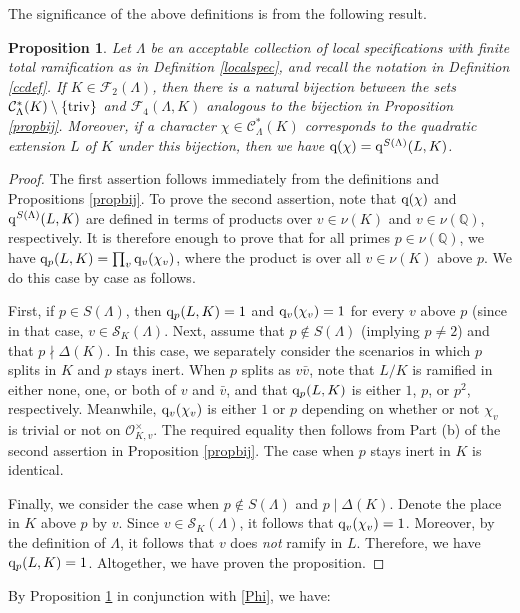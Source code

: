 \documentclass[10pt]{article}
\theoremstyle{plain}
\newtheorem{proposition}[thm]{Proposition}
\theoremstyle{definition}
\theoremstyle{remark}
\def\val{{\nu}}
\def\FF{{\mathcal F}}
\def\Q{{\mathbb Q}}
\def\Q{{\mathbb Q}}
\def\cC{{\mathcal C}}
\def\cF{{\mathcal F}}
\def\cO{{\mathcal O}}
\def\cS{{\mathcal S}}
\newcommand{\q}{{\rm q}}
\begin{document}
\noindent The significance of the above definitions is from the
following result.
\begin{proposition}\label{corbij}
Let $\Lambda$ be an acceptable collection of local
specifications with finite total ramification as in Definition \ref{localspec}, and recall the notation in Definition \ref{ccdef}. If $K \in
\cF_2(\Lambda)$, then there is a natural bijection between the sets
$\cC^{\ast}_{\Lambda}(K)\setminus\{\rm triv\}$ and
$\FF_4(\Lambda,K)$ analogous to the bijection in Proposition \ref{propbij}. Moreover, if a character $\chi \in
\cC^{\ast}_{\Lambda}(K)$ corresponds to the quadratic extension $L$ of
$K$ under this bijection, then we have
$\q(\chi)=\q^{S(\Lambda)}(L,K)$.
\end{proposition}
\begin{proof}
The first assertion follows immediately from the definitions and
Propositions \ref{propbij}. To prove the second assertion, note that
$\q(\chi)$ and $\q^{S(\Lambda)}(L,K)$ are defined in terms of products
over $v\in\val(K)$ and $v\in\val(\Q)$, respectively. It is therefore
enough to prove that for all primes $p\in\val(\Q)$, we have
$\q_p(L,K)=\prod_v\q_v(\chi_v)$, where the product is over all
$v\in\val(K)$ above $p$. We do this case by case as follows.

First, if $p\in S(\Lambda)$, then $\q_p(L,K)=1$ and $\q_v(\chi_v)=1$
for every $v$ above $p$ (since in that case,
$v\in\cS_K(\Lambda)$. Next, assume that $p\notin S(\Lambda)$ (implying
$p\neq 2$) and that $p\nmid\Delta(K)$. In this case, we separately
consider the scenarios in which $p$ splits in $K$ and $p$ stays
inert. When $p$ splits as $v\bar{v}$, note that $L/K$ is ramified in
either none, one, or both of $v$ and $\bar{v}$, and that $\q_p(L,K)$
is either $1$, $p$, or $p^2$, respectively. Meanwhile, $\q_v(\chi_v)$
is either $1$ or $p$ depending on whether or not $\chi_v$ is trivial
or not on $\cO_{K,v}^\times$. The required equality then follows from
Part (b) of the second assertion in Proposition \ref{propbij}. The
case when $p$ stays inert in $K$ is identical.

Finally, we consider the case when $p\notin S(\Lambda)$ and
$p\mid\Delta(K)$. Denote the place in $K$ above $p$ by $v$. Since
$v\in\cS_K(\Lambda)$, it follows that $\q_v(\chi_v)=1$. Moreover, by
the definition of $\Lambda$, it follows that $v$ does {\it not} ramify
in $L$. Therefore, we have $\q_p(L,K)=1$. Altogether, we have proven
the proposition.
\end{proof}
By Proposition \ref{corbij} in conjunction with \eqref{Phi}, we have:
\end{document}
